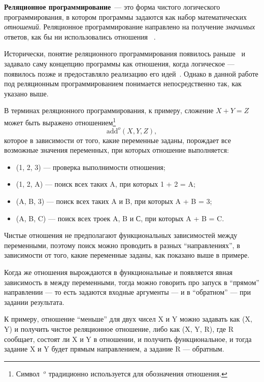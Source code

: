 {\bf Реляционное программирование}~--- это форма чистого логического
программирования, в котором программы задаются как набор
математических {\it отношений}. Реляционное программирование направлено
на получение \emph{значимых} ответов, как бы ни использовались отношения
~\cite{byrdMK}.

Исторически, понятие реляционного программирования появилось
раньше~\cite{relML} и задавало саму концепцию программы как отношения,
когда логическое --- появилось позже и предоставляло реализацию его
идей~\cite{logicMJ}.
Однако в данной работе под реляционным программированием понимается
непосредственно так, как указано выше.

В терминах реляционного программирования, к примеру, сложение $X + Y = Z$
может быть выражено отношением\footnote{Символ $\ ^o$ традиционно
используется для обозначения отношения.}
\[\text{add}^o (X, Y, Z),\]
которое в зависимости от того, какие переменные заданы, порождает
все возможные значения переменных, при которых отношение выполняется:
\begin{itemize}
\item {}(1, 2, 3) --- проверка выполнимости отношения;
\item {}(1, 2, A) --- поиск всех таких A, при которых 1 + 2 = A;
\item {}(A, B, 3) --- поиск всех таких A и B, при которых A + B = 3;
\item {}(A, B, C) --- поиск всех троек A, B и С, при которых A + B = C.
\end{itemize}

Чистые отношения не предполагают функциональных зависимостей между переменными,
поэтому поиск можно проводить в разных ``направлениях'', в зависимости от
того, какие переменные заданы, как показано выше в примере.

Когда же отношения вырождаются в функциональные и появляется
явная зависимость в между переменными, тогда можно говорить про запуск
в ``прямом'' направлении --- то есть задаются входные аргументы --- и в
``обратном'' --- при задании результата.

К примеру, отношение ``меньше'' для двух чисел X и Y можно задавать как
(X, Y) и получить чистое реляционное отношение, либо
как (X, Y, R), где R сообщает, состоят ли X и Y
в отношении, и получить функциональное, и тогда задание X и Y будет
прямым направлением, а задание R --- обратным.


